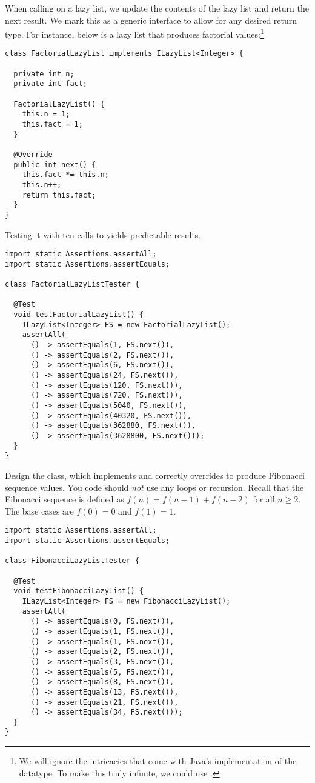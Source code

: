 When calling  on a lazy list, we update the contents of the lazy list and return the next result. We mark this as a generic interface to allow for any desired return type. For instance, below is a lazy list that produces factorial values:\footnote{We will ignore the intricacies that come with Java's implementation of the  datatype. To make this truly infinite, we could use .}
\begin{lstlisting}[language=MyJava]
class FactorialLazyList implements ILazyList<Integer> {

  private int n;
  private int fact;
 
  FactorialLazyList() {
    this.n = 1;
    this.fact = 1;
  }

  @Override
  public int next() {
    this.fact *= this.n;
    this.n++;
    return this.fact;
  }
}
\end{lstlisting}

Testing it with ten calls to  yields predictable results.

\begin{lstlisting}[language=MyJava]
import static Assertions.assertAll;
import static Assertions.assertEquals;

class FactorialLazyListTester {

  @Test
  void testFactorialLazyList() {
    ILazyList<Integer> FS = new FactorialLazyList();
    assertAll(
      () -> assertEquals(1, FS.next()),
      () -> assertEquals(2, FS.next()),
      () -> assertEquals(6, FS.next()),
      () -> assertEquals(24, FS.next()),
      () -> assertEquals(120, FS.next()),
      () -> assertEquals(720, FS.next()),
      () -> assertEquals(5040, FS.next()),
      () -> assertEquals(40320, FS.next()),
      () -> assertEquals(362880, FS.next()),
      () -> assertEquals(3628800, FS.next()));
  }
}
\end{lstlisting}

Design the  class, which implements  and correctly overrides  to produce Fibonacci sequence values. You code should \emph{not} use any loops or recursion. Recall that the Fibonacci sequence is defined as $f(n) = f(n - 1) + f(n - 2)$ for all $n\geq{2}$. The base cases are $f(0) = 0$ and $f(1) = 1$.

\begin{lstlisting}[language=MyJava]
import static Assertions.assertAll;
import static Assertions.assertEquals;

class FibonacciLazyListTester {

  @Test
  void testFibonacciLazyList() {
    ILazyList<Integer> FS = new FibonacciLazyList();
    assertAll(
      () -> assertEquals(0, FS.next()),
      () -> assertEquals(1, FS.next()),
      () -> assertEquals(1, FS.next()),
      () -> assertEquals(2, FS.next()),
      () -> assertEquals(3, FS.next()),
      () -> assertEquals(5, FS.next()),
      () -> assertEquals(8, FS.next()),
      () -> assertEquals(13, FS.next()),
      () -> assertEquals(21, FS.next()),
      () -> assertEquals(34, FS.next()));
  }
}
\end{lstlisting}

